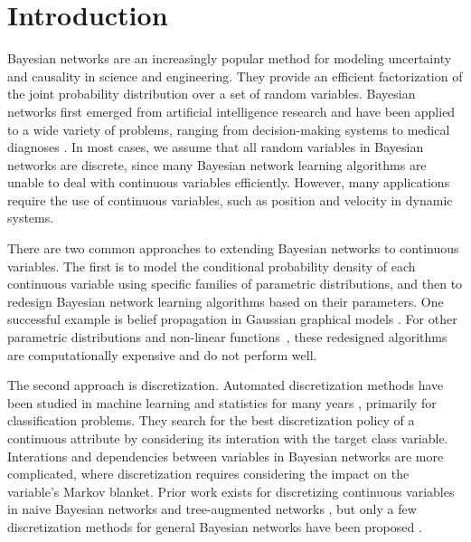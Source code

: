 \section{Introduction}
\label{intro}
Bayesian networks \citep{Pearl_1988, PGM_2009} are an increasingly popular method for modeling uncertainty and causality in science and engineering. They provide an efficient factorization of the joint probability distribution over a set of random variables. Bayesian networks first emerged from artificial intelligence research and have been applied to a wide variety of problems, ranging from decision-making systems \citep{DMU_2015} to medical diagnoses \citep{Lustgarten_2011}. In most cases, we assume that all random variables in Bayesian networks are discrete, since many Bayesian network learning algorithms are unable to deal with continuous variables efficiently. However, many applications
require the use of continuous variables, such as position and velocity in dynamic systems.

There are two common approaches to extending Bayesian networks to continuous variables.
The first is to model the conditional probability density of each continuous variable using specific families of parametric distributions, and then to redesign Bayesian network learning algorithms based on their parameters.
One successful example is belief propagation in Gaussian graphical models \citep{Weiss_2011}.
For other parametric distributions \citep{Ihler_2009} and non-linear functions~\todo{[cite]}, these redesigned algorithms are computationally expensive and do not perform well.

The second approach is discretization.
Automated discretization methods have been studied in machine learning and statistics for many years \citep{Dougherty_1995, Kerber_1992, Holte_1993, Fayyad_1993}, primarily for classification problems.
They search for the best discretization policy of a continuous attribute by considering its interation with the target class variable.
Interations and dependencies between variables in Bayesian networks are more complicated, where discretization requires considering the impact on the variable's Markov blanket.
Prior work exists for discretizing continuous variables in naive Bayesian networks and tree-augmented networks \citep{Fried_naive}, but only a few discretization methods for general Bayesian networks have been proposed \citep{Friedman_1996, Kozlov_1997, Monti_1998, Steck_2007}.


